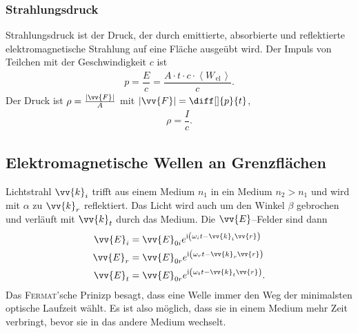 \documentclass[a4paper,12pt]{article}
\numberwithin{equation}{section}
\begin{document}
\subsubsection{Strahlungsdruck}
Strahlungsdruck ist der Druck, der durch emittierte, absorbierte und reflektierte elektromagnetische Strahlung auf eine Fläche ausgeübt wird. Der Impuls von Teilchen mit der Geschwindigkeit $c$ ist
\begin{align} 
        p=\dfrac{E}{c}=\dfrac{A\cdot t\cdot c\cdot  \left\langle W_{\,\text{el}\,}\right\rangle }{c}
.\end{align} 
Der Druck ist $\rho =\tfrac{|\vv{F}|}{A}$ mit $|\vv{F}|=\diff[]{p}{t}$,
\begin{align} 
        \rho =\dfrac{I}{c}
.\end{align} 

\subsection{Elektromagnetische Wellen an Grenzflächen}
Lichtstrahl $\vv{k}_i$ trifft aus einem Medium $n_1$ in ein Medium $n_2>n_1$ und wird mit $\alpha $ zu $\vv{k}_r$ reflektiert. Das Licht wird auch um den Winkel $\beta $ gebrochen und verläuft mit $\vv{k}_t$ durch das Medium. Die $\vv{E}$--Felder sind dann
\begin{align} 
        \vv{E}_i&=\vv{E}_{0i}e^{\text{i}\left(\omega _it-\vv{k}_i\vv{r}\right)}\\
        \vv{E}_r&=\vv{E}_{0r}e^{\text{i}\left(\omega _rt-\vv{k}_r\vv{r}\right)}\\
        \vv{E}_t&=\vv{E}_{0r}e^{\text{i}\left(\omega _tt-\vv{k}_t\vv{r}\right)}
.\end{align} 
Das \textsc{Fermat}'sche Prinizp besagt, dass eine Welle immer den Weg der minimalsten optische Laufzeit wählt. Es ist also möglich, dass sie in einem Medium mehr Zeit verbringt, bevor sie in das andere Medium wechselt.
\end{document}
